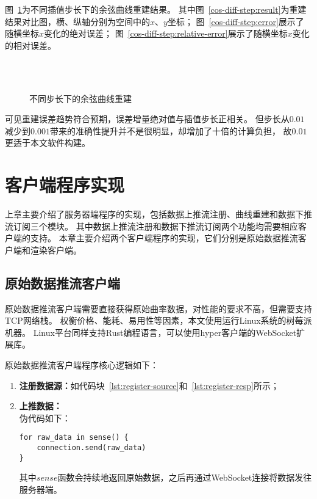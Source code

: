 图~\ref{fig:cos-diff-step}为不同插值步长下的余弦曲线重建结果。
其中图~\ref{cos-diff-step:result}为重建结果对比图，横、纵轴分别为空间中的$x$、$y$坐标；
图~\ref{cos-diff-step:error}展示了随横坐标$x$变化的绝对误差；
图~\ref{cos-diff-step:relative-error}展示了随横坐标$x$变化的相对误差。

\begin{figure}
\centering
{}\\
\\
\caption{不同步长下的余弦曲线重建}
\label{fig:cos-diff-step}
\end{figure}

可见重建误差趋势符合预期，误差增量绝对值与插值步长正相关。
但步长从$0.01$减少到$0.001$带来的准确性提升并不是很明显，却增加了十倍的计算负担，
故$0.01$更适于本文软件构建。

\FloatBarrier
\clearpage

\section{客户端程序实现}
\label{sec:client}
上章主要介绍了服务器端程序的实现，包括数据上推流注册、曲线重建和数据下推流订阅三个模块。
其中数据上推流注册和数据下推流订阅两个功能均需要相应客户端的支持。
本章主要介绍两个客户端程序的实现，它们分别是原始数据推流客户端和渲染客户端。

\subsection{原始数据推流客户端}
原始数据推流客户端需要直接获得原始曲率数据，对性能的要求不高，但需要支持TCP网络栈。
权衡价格、能耗、易用性等因素，本文使用运行Linux系统的树莓派机器。
Linux平台同样支持Rust编程语言，可以使用hyper客户端的WebSocket扩展库。

原始数据推流客户端程序核心逻辑如下：

\begin{enumerate}
\item \textbf{注册数据源：}如代码块~\ref{lst:register-source}和~\ref{lst:register-resp}所示；
\item \textbf{上推数据：} \\
伪代码如下：

\begin{lstlisting}[caption={上推数据}]
for raw_data in sense() {
    connection.send(raw_data)
}
\end{lstlisting}

其中$sense$函数会持续地返回原始数据，之后再通过WebSocket连接将数据发往服务器端。

\end{enumerate}

